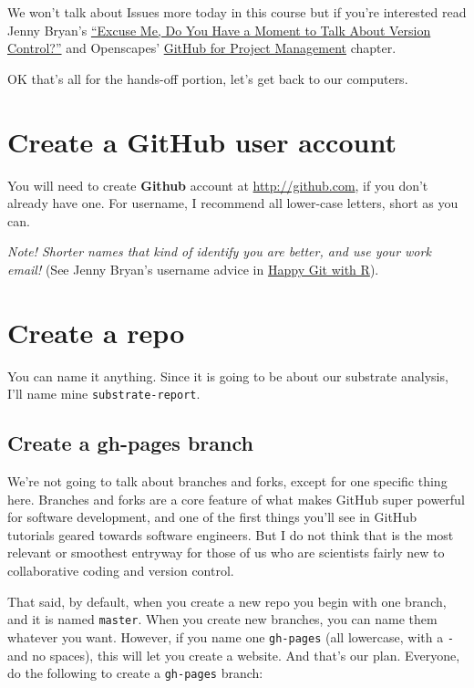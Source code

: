 \documentclass[]{book}
\begin{document}
We won't talk about Issues more today in this course but if you're interested read Jenny Bryan's \href{https://peerj.com/preprints/3159/}{``Excuse Me, Do You Have a Moment to Talk About Version Control?''} and Openscapes' \href{https://openscapes.github.io/series/github-issues}{GitHub for Project Management} chapter.

OK that's all for the hands-off portion, let's get back to our computers.

\hypertarget{create-a-github-user-account}{%
\section{Create a GitHub user account}\label{create-a-github-user-account}}

You will need to create \textbf{Github} account at \url{http://github.com}, if you don't already have one. For username, I recommend all lower-case letters, short as you can.

\emph{Note! Shorter names that kind of identify you are better, and use your work email!}
(See Jenny Bryan's username advice in \href{https://happygitwithr.com/github-acct.html}{Happy Git with R}).

\hypertarget{create-a-repo}{%
\section{Create a repo}\label{create-a-repo}}

You can name it anything. Since it is going to be about our substrate analysis, I'll name mine \texttt{substrate-report}.

\hypertarget{create-a-gh-pages-branch}{%
\subsection{Create a gh-pages branch}\label{create-a-gh-pages-branch}}

We're not going to talk about branches and forks, except for one specific thing here. Branches and forks are a core feature of what makes GitHub super powerful for software development, and one of the first things you'll see in GitHub tutorials geared towards software engineers. But I do not think that is the most relevant or smoothest entryway for those of us who are scientists fairly new to collaborative coding and version control.

That said, by default, when you create a new repo you begin with one branch, and it is named \texttt{master}. When you create new branches, you can name them whatever you want. However, if you name one \texttt{gh-pages} (all lowercase, with a \texttt{-} and no spaces), this will let you create a website. And that's our plan. Everyone, do the following to create a \texttt{gh-pages} branch:
\end{document}

